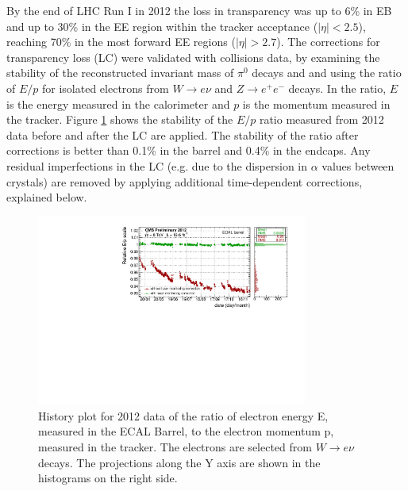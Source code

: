 \documentclass[journal]{IEEEtran}
\begin{document}
By the end of LHC Run I in 2012 the loss in transparency was up to 6\% in EB and up to 30\% in the EE region within the tracker acceptance ($\vert\eta\vert<2.5$), reaching 70\% in the most forward EE regions ($\vert\eta\vert>2.7$). The corrections for transparency loss (LC) were validated with collisions data, by examining the stability of the reconstructed invariant mass of $\pi^0$ decays and and using the ratio of $E/p$ for isolated electrons from $W\to e\nu$ and $Z\to e^+e^-$ decays. In the ratio, $E$ is the energy measured in the calorimeter and $p$ is the momentum measured in the tracker. Figure \ref{fig:EoP_2012} shows the stability of the $E/p$ ratio measured from 2012 data before and after the LC are applied. The stability of the ratio after corrections is better than 0.1\% in the barrel and 0.4\% in the endcaps.  Any residual imperfections in the LC (e.g. due to the dispersion in $\alpha$ values between crystals) are removed by applying additional time-dependent corrections, explained below.
%
\begin{figure}[!t]
  \begin{center}
    \includegraphics[width=3.5in]{EoP_EB_Winter2013}
    \caption{History plot for 2012 data of the ratio of electron energy E, measured in the ECAL Barrel, to the electron momentum p, measured in the tracker.  The electrons are selected from $W\to e\nu$ decays. The projections along the Y axis are shown in the histograms on the right side. \label{fig:EoP_2012}}
  \end{center}
\end{figure}
\end{document}
